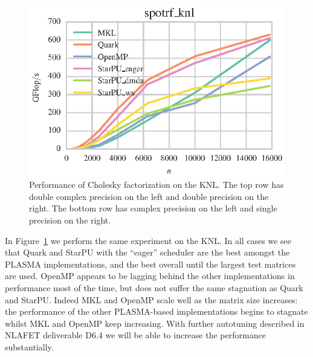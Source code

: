 \documentclass[a4paper,12pt]{article}
\begin{document}
\begin{figure}[t]
  \includegraphics[scale=.85]{fig/knl_ram_spotrf_weak_scaling.eps}
  \caption{Performance of Cholesky factorization on the KNL.
    The top row has double complex precision on the left and double
    precision on the right.
    The bottom row has complex precision on the left and single
    precision on the right.}
  \label{fig.chol_knl_ram}
\end{figure}

In Figure~\ref{fig.chol_knl_ram} we perform the same experiment
on the KNL.
In all cases we see that Quark and StarPU with the ``eager''
scheduler are the best amongst the PLASMA implementations,
and the best overall until the largest test matrices are used.
OpenMP appears to be lagging behind the other implementations
in performance most of the time,
but does not suffer the same stagnation as Quark and StarPU.
Indeed MKL and OpenMP scale well as the matrix size increases:
the performance of the other PLASMA-based implementations
begins to stagnate whilst MKL and OpenMP keep increasing.
With further autotuning described in NLAFET deliverable D6.4
we will be able to increase the performance substantially.


\end{document}
